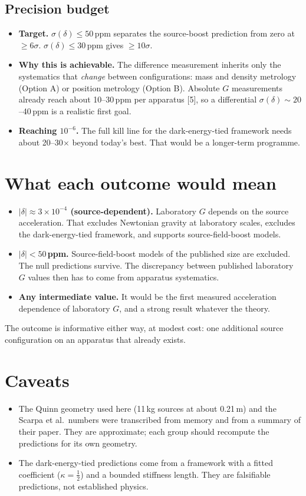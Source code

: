 \documentclass[10pt]{article}
\begin{document}
\subsection*{Precision budget}
\begin{itemize}
\item \textbf{Target.} $\sigma(\delta)\le50$\,ppm separates the source-boost prediction from zero at $\ge6\sigma$. $\sigma(\delta)\le30$\,ppm gives $\ge10\sigma$.
\item \textbf{Why this is achievable.} The difference measurement inherits only the systematics that \emph{change} between configurations: mass and density metrology (Option A) or position metrology (Option B). Absolute $G$ measurements already reach about 10--30\,ppm per apparatus [5], so a differential $\sigma(\delta)\sim20$--40\,ppm is a realistic first goal.
\item \textbf{Reaching $10^{-6}$.} The full kill line for the dark-energy-tied framework needs about 20--30$\times$ beyond today's best. That would be a longer-term programme.
\end{itemize}

\section{What each outcome would mean}
\begin{itemize}
\item \textbf{$|\delta|\approx3\times10^{-4}$ (source-dependent).} Laboratory $G$ depends on the source acceleration. That excludes Newtonian gravity at laboratory scales, excludes the dark-energy-tied framework, and supports source-field-boost models.
\item \textbf{$|\delta|<50$\,ppm.} Source-field-boost models of the published size are excluded. The null predictions survive. The discrepancy between published laboratory $G$ values then has to come from apparatus systematics.
\item \textbf{Any intermediate value.} It would be the first measured acceleration dependence of laboratory $G$, and a strong result whatever the theory.
\end{itemize}
The outcome is informative either way, at modest cost: one additional source configuration on an apparatus that already exists.

\section{Caveats}
\begin{itemize}
\item The Quinn geometry used here (11\,kg sources at about 0.21\,m) and the Scarpa et al.\ numbers were transcribed from memory and from a summary of their paper. They are approximate; each group should recompute the predictions for its own geometry.
\item The dark-energy-tied predictions come from a framework with a fitted coefficient ($\kappa=\tfrac12$) and a bounded stiffness length. They are falsifiable predictions, not established physics.
\end{itemize}
\end{document}
